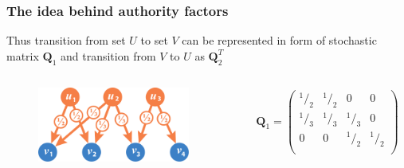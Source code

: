 \documentclass{beamer}
\newcommand{\mQ}{\mathbf{Q}}
\newcommand*\rfrac[2]{{}^{#1}\!/_{#2}}
\begin{document}
\begin{frame}
\frametitle{The idea behind authority factors}
Thus transition from set $U$ to set $V$ can be represented in form of
stochastic matrix $\mQ_1$ and transition from $V$ to $U$ as $\mQ_2^T$
\begin{columns}[T] %
\begin{column}{.48\textwidth}
\begin{figure}[h] 
    \includegraphics[width=5cm]{DemoGraphQ1.pdf}
\end{figure}
\end{column}%
\hfill%
\begin{column}{.48\textwidth}
\begin{eqnarray*}
\mQ_1 =  \left(
 \begin{array}{cccc}
    \rfrac{1}{2} & \rfrac{1}{2}& 0& 0\\
    \rfrac{1}{3}& \rfrac{1}{3}& \rfrac{1}{3}& 0\\
    0& 0& \rfrac{1}{2}& \rfrac{1}{2}\\
  \end{array}
   \right)
\end{eqnarray*}

\end{column}%
\end{columns}
\end{frame}
\end{document}
